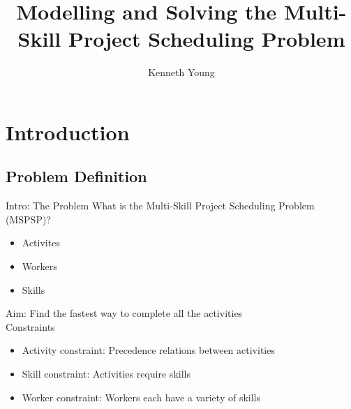 \documentclass{beamer}
\title{Modelling and Solving the Multi-Skill Project Scheduling Problem}
\author{Kenneth Young}
\begin{document}
\maketitle

\section{Introduction}
\subsection{Problem Definition}
\begin{frame}{Intro: The Problem}
	\pause What is the Multi-Skill Project Scheduling Problem (MSPSP)?\pause
	\begin{itemize}
		\item Activites\pause
		\item Workers\pause
		\item Skills\pause
	\end{itemize}
	\vspace{4mm}
	\alert{Aim:} Find the fastest way to complete all the activities\pause\\
	\vspace{4mm}
	Constraints\pause
	\begin{itemize}
		\item Activity constraint: Precedence relations between activities\pause
		\item Skill constraint: Activities require skills\pause
		\item Worker constraint: Workers each have a variety of skills
	\end{itemize}
\end{frame}
\end{document}
